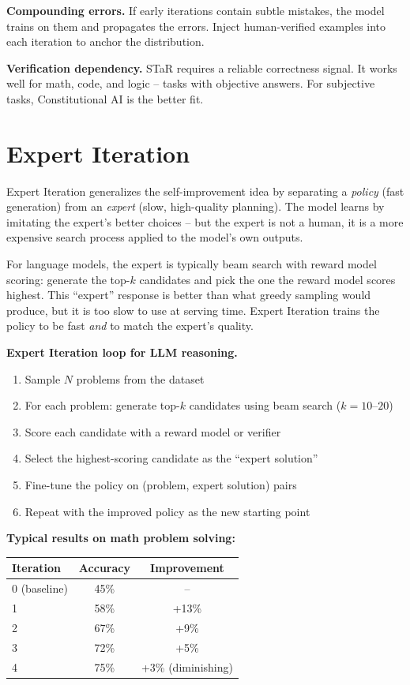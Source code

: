 \begin{chapterenv}
\begin{tipbox}
\textbf{Compounding errors.} If early iterations contain subtle mistakes, the model trains on them and propagates the errors. Inject human-verified examples into each iteration to anchor the distribution.

\textbf{Verification dependency.} STaR requires a reliable correctness signal. It works well for math, code, and logic -- tasks with objective answers. For subjective tasks, Constitutional AI is the better fit.
\end{tipbox}

\section{Expert Iteration}

Expert Iteration generalizes the self-improvement idea by separating a \textit{policy} (fast generation) from an \textit{expert} (slow, high-quality planning). The model learns by imitating the expert's better choices -- but the expert is not a human, it is a more expensive search process applied to the model's own outputs.

For language models, the expert is typically beam search with reward model scoring: generate the top-$k$ candidates and pick the one the reward model scores highest. This ``expert'' response is better than what greedy sampling would produce, but it is too slow to use at serving time. Expert Iteration trains the policy to be fast \textit{and} to match the expert's quality.

\begin{infobox}
\textbf{Expert Iteration loop for LLM reasoning.}

\begin{enumerate}
\item Sample $N$ problems from the dataset
\item For each problem: generate top-$k$ candidates using beam search ($k = 10$--$20$)
\item Score each candidate with a reward model or verifier
\item Select the highest-scoring candidate as the ``expert solution''
\item Fine-tune the policy on (problem, expert solution) pairs
\item Repeat with the improved policy as the new starting point
\end{enumerate}

\textbf{Typical results on math problem solving:}

\begin{tabular}{lcc}
\toprule
Iteration & Accuracy & Improvement \\
\midrule
0 (baseline) & 45\% & -- \\
1 & 58\% & +13\% \\
2 & 67\% & +9\% \\
3 & 72\% & +5\% \\
4 & 75\% & +3\% (diminishing) \\
\bottomrule
\end{tabular}


\end{infobox}
\end{chapterenv}
